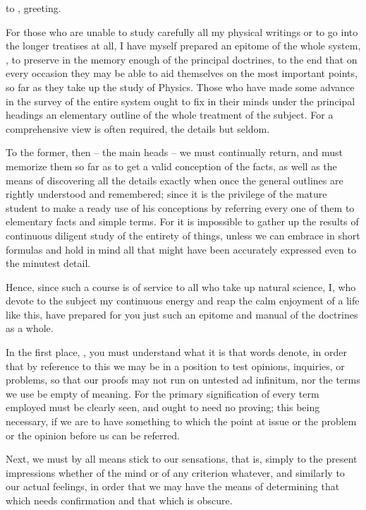 \documentclass{stex}
\begin{document}

\noindent {} to , greeting.

For those who are unable to study carefully all my physical writings or to go into the longer treatises at all, I have myself prepared an epitome of the whole system, , to preserve in the memory enough of the principal doctrines, to the end that on every occasion they may be able to aid themselves on the most important points, so far as they take up the study of Physics.
Those who have made some advance in the survey of the entire system ought to fix in their minds under the principal headings an elementary outline of the whole treatment of the subject.
For a comprehensive view is often required, the details but seldom.

To the former, then – the main heads – we must continually return, and must memorize them so far as to get a valid conception of the facts, as well as the means of discovering all the details exactly when once the general outlines are rightly understood and remembered; since it is the privilege of the mature student to make a ready use of his conceptions by referring every one of them to elementary facts and simple terms.
For it is impossible to gather up the results of continuous diligent study of the entirety of things, unless we can embrace in short formulas and hold in mind all that might have been accurately expressed even to the minutest detail.

Hence, since such a course is of service to all who take up natural science, I, who devote to the subject my continuous energy and reap the calm enjoyment of a life like this, have prepared for you just such an epitome and manual of the doctrines as a whole.

In the first place, , you must understand what it is that words denote, in order that by reference to this we may be in a position to test opinions, inquiries, or problems, so that our proofs may not run on untested \foreignlanguage{latin}{ad infinitum}, nor the terms we use be empty of meaning.
For the primary signification of every term employed must be clearly seen, and ought to need no proving; this being necessary, if we are to have something to which the point at issue or the problem or the opinion before us can be referred.

Next, we must by all means stick to our sensations, that is, simply to the present impressions whether of the mind or of any criterion whatever, and similarly to our actual feelings, in order that we may have the means of determining that which needs confirmation and that which is obscure.
\end{document}
